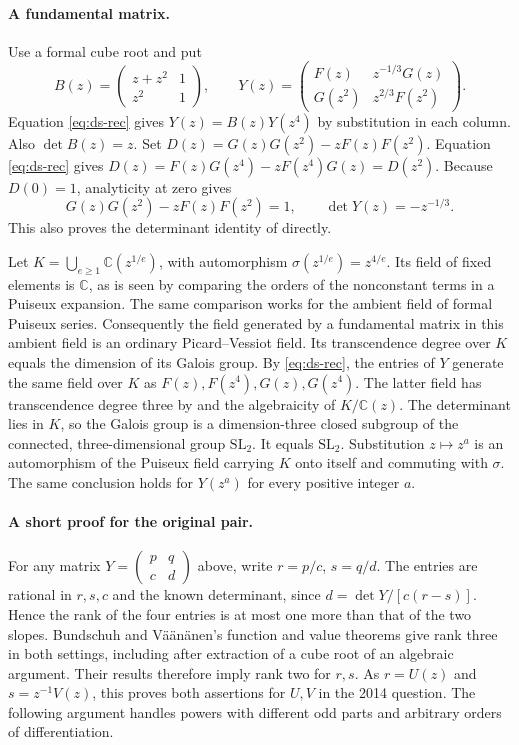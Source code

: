 \documentclass[11pt,a4paper]{article}
\theoremstyle{definition}
\theoremstyle{remark}
\numberwithin{equation}{section}
\begin{document}
\paragraph{A fundamental matrix.}
Use a formal cube root and put
\[
 B(z)=\begin{pmatrix}z+z^2&1\\z^2&1\end{pmatrix},\qquad
 Y(z)=\begin{pmatrix} F(z)&z^{-1/3}G(z)\\G(z^2)&z^{2/3}F(z^2)\end{pmatrix}.
\]
Equation \eqref{eq:ds-rec} gives \(Y(z)=B(z)Y(z^4)\) by substitution in each column. Also \(\det B(z)=z\). Set \(D(z)=G(z)G(z^2)-zF(z)F(z^2)\). Equation \eqref{eq:ds-rec} gives \(D(z)=F(z)G(z^4)-zF(z^4)G(z)=D(z^2)\). Because \(D(0)=1\), analyticity at zero gives
\begin{equation}
 G(z)G(z^2)-zF(z)F(z^2)=1,\qquad \det Y(z)=-z^{-1/3}.
 \label{eq:ds-det}
\end{equation}
This also proves the determinant identity of \cite[Proposition 5.2]{ds09} directly.

Let \(K=\bigcup_{e\geq1}\mathbb C(z^{1/e})\), with automorphism \(\sigma(z^{1/e})=z^{4/e}\). Its field of fixed elements is \(\mathbb C\), as is seen by comparing the orders of the nonconstant terms in a Puiseux expansion. The same comparison works for the ambient field of formal Puiseux series. Consequently the field generated by a fundamental matrix in this ambient field is an ordinary Picard--Vessiot field. Its transcendence degree over \(K\) equals the dimension of its Galois group. By \eqref{eq:ds-rec}, the entries of \(Y\) generate the same field over \(K\) as \(F(z),F(z^4),G(z),G(z^4)\). The latter field has transcendence degree three by \cite[Theorem 1.2]{dsbv15} and the algebraicity of \(K/\mathbb C(z)\). The determinant lies in \(K\), so the Galois group is a dimension-three closed subgroup of the connected, three-dimensional group \(\mathrm{SL}_2\). It equals \(\mathrm{SL}_2\). Substitution \(z\mapsto z^a\) is an automorphism of the Puiseux field carrying \(K\) onto itself and commuting with \(\sigma\). The same conclusion holds for \(Y(z^a)\) for every positive integer \(a\).

\paragraph{A short proof for the original pair.}
For any matrix \(Y=\left(\begin{smallmatrix}p&q\\c&d\end{smallmatrix}\right)\) above, write \(r=p/c\), \(s=q/d\). The entries are rational in \(r,s,c\) and the known determinant, since \(d=\det Y/[c(r-s)]\). Hence the rank of the four entries is at most one more than that of the two slopes. Bundschuh and V\"a\"an\"anen's function and value theorems give rank three in both settings, including after extraction of a cube root of an algebraic argument. Their results therefore imply rank two for \(r,s\). As \(r=U(z)\) and \(s=z^{-1}V(z)\), this proves both assertions for \(U,V\) in the 2014 question. The following argument handles powers with different odd parts and arbitrary orders of differentiation.
\end{document}
